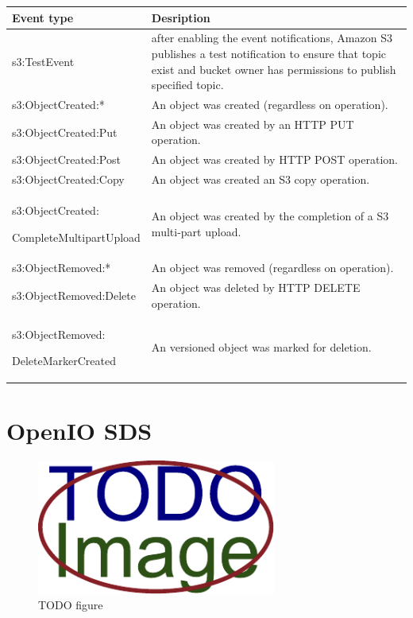      \renewcommand*{\arraystretch}{1.4}
     \begin{tabularx}{\textwidth}{|p{}|X|}
         \hline
         \textbf{Event type} & \textbf{Desription} \\
         \hline
         s3:TestEvent & after enabling the event notifications, Amazon S3 publishes a test notification to ensure that topic exist and bucket owner has permissions to publish specified topic. \\
         \hline
         s3:ObjectCreated:* & An object was created (regardless on operation). \\
         \hline
         s3:ObjectCreated:Put & An object was created by an HTTP PUT operation. \\
         \hline
         s3:ObjectCreated:Post & An object was created by HTTP POST operation. \\
         \hline
         s3:ObjectCreated:Copy & An object was created an S3 copy operation. \\
         \hline
         s3:ObjectCreated:

         CompleteMultipartUpload & An object was created by the completion of a S3 multi-part upload. \\
         \hline
         s3:ObjectRemoved:* & An object was removed (regardless on operation). \\
         \hline
         s3:ObjectRemoved:Delete & An object was deleted by HTTP DELETE operation. \\
         \hline
         s3:ObjectRemoved:

         DeleteMarkerCreated & An versioned object was marked for deletion. \\
         \hline
    \end{tabularx}


\chapter{OpenIO SDS}
    \textcolor{gray}{\Blindtext}
    \begin{figure}[hbt]
        \centering
        \includegraphics[width=0.7\textwidth]{obrazky-figures/placeholder.pdf}
        \caption{TODO figure}
    \end{figure}
